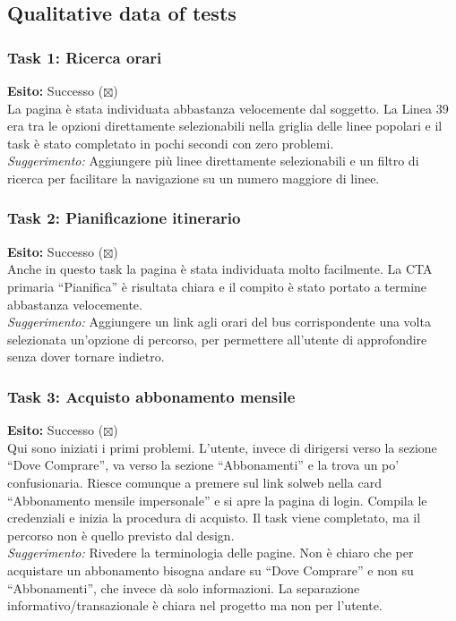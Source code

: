﻿\documentclass[11pt,a4paper]{article}
\begin{document}
\subsection*{Qualitative data of tests}
\begin{tcolorbox}[base]

\subsubsection*{Task 1: Ricerca orari}
\noindent\textbf{Esito:} Successo ($\boxtimes$)\\[0.2cm]
La pagina è stata individuata abbastanza velocemente dal
soggetto. La Linea 39 era tra le opzioni direttamente
selezionabili nella griglia delle linee popolari e il task
è stato completato in pochi secondi con zero problemi.\\[0.2cm]
\textit{Suggerimento:} Aggiungere più linee direttamente
selezionabili e un filtro di ricerca per facilitare la
navigazione su un numero maggiore di linee.

\vspace{0.3cm}

\subsubsection*{Task 2: Pianificazione itinerario}
\noindent\textbf{Esito:} Successo ($\boxtimes$)\\[0.2cm]
Anche in questo task la pagina è stata individuata molto
facilmente. La CTA primaria ``Pianifica'' è risultata chiara
e il compito è stato portato a termine abbastanza
velocemente.\\[0.2cm]
\textit{Suggerimento:} Aggiungere un link agli orari del bus
corrispondente una volta selezionata un'opzione di percorso,
per permettere all'utente di approfondire senza dover tornare
indietro.

\vspace{0.3cm}

\subsubsection*{Task 3: Acquisto abbonamento mensile}
\noindent\textbf{Esito:} Successo ($\boxtimes$)\\[0.2cm]
Qui sono iniziati i primi problemi. L'utente, invece di
dirigersi verso la sezione ``Dove Comprare'', va verso la
sezione ``Abbonamenti'' e la trova un po' confusionaria.
Riesce comunque a premere sul link solweb nella card
``Abbonamento mensile impersonale'' e si apre la pagina di
login. Compila le credenziali e inizia la procedura di
acquisto. Il task viene completato, ma il percorso non è
quello previsto dal design.\\[0.2cm]
\textit{Suggerimento:} Rivedere la terminologia delle pagine.
Non è chiaro che per acquistare un abbonamento bisogna andare
su ``Dove Comprare'' e non su ``Abbonamenti'', che invece dà
solo informazioni. La separazione informativo/transazionale è
chiara nel progetto ma non per l'utente.


\end{tcolorbox}
\end{document}
